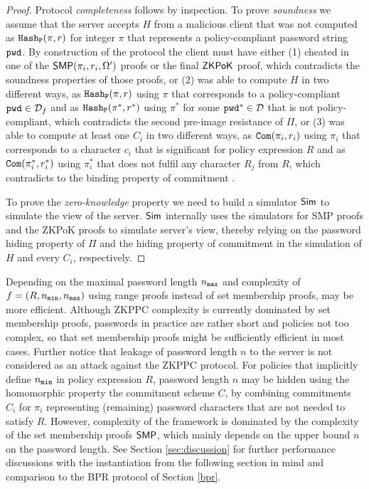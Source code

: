 \begin{proof}
Protocol \emph{completeness} follows by inspection.
To prove \emph{soundness} we assume that the server accepts $H$ from a malicious client that was not computed as $\mathtt{Hash_P}(\pi,r)$ for integer $\pi$ that represents a policy-compliant password string $\mathtt{pwd}$. 
By construction of the protocol the client must have either 
(1) cheated in one of the $\mathsf{SMP}(\pi_i,r_i,\Omega')$ proofs or the final $\mathsf{ZKPoK}$ proof, which contradicts the soundness properties of those proofs, or 
(2) was able to compute $H$ in two different ways, as $\mathtt{Hash_P}(\pi,r)$ using $\pi$ that corresponds to a policy-compliant $\mathtt{pwd}\in\mathcal{D}_f$ and as $\mathtt{Hash_P}(\pi^\ast,r^\ast)$ using $\pi^\ast$ for some $\mathtt{pwd}^\ast\in\mathcal{D}$ that is not policy-compliant, which contradicts the second pre-image resistance of $\Pi$, or 
(3) was able to compute at least one $C_i$ in two different ways, as $\mathtt{Com}(\pi_i, r_i)$ using $\pi_i$  that corresponds to a character $c_i$ that is significant for policy expression $R$ and as $\mathtt{Com}(\pi^\ast_i, r^\ast_i)$ using $\pi^\ast_i$ that does not fulfil any character $R_j$ from $R$, which contradicts to the binding property of commitment \Commitment.

To prove the \emph{zero-knowledge} property we need to build a simulator $\mathsf{Sim}$ to simulate the view of the server. 
$\mathsf{Sim}$ internally uses the simulators for \ac{SMP} proofs and the \ac{ZKPoK} proofs to simulate server's view, thereby relying on the password hiding property of $\Pi$ and the hiding property of commitment \Commitment in the simulation of $H$ and every $C_i$, respectively.
\end{proof}

\begin{remark}\label{rangeproofs}
Depending on the maximal password length ${n_\mathtt{max}}$ and complexity of $f=(R,{n_\mathtt{min}},{n_\mathtt{max}})$ using range proofs instead of set membership proofs, may be more efficient.
Although \ac{ZKPPC} complexity is currently dominated by set membership proofs, passwords in practice are rather short and policies not too complex, so that set membership proofs might be sufficiently efficient in most cases.
Further notice that leakage of password length $n$ to the server is not considered as an attack against the \ac{ZKPPC} protocol. 
For policies that implicitly define ${n_\mathtt{min}}$ in policy expression $R$, password length $n$ may be hidden using the homomorphic property the commitment scheme $C$, \ie by combining commitments $C_i$ for $\pi_i$ representing (remaining) password characters that are not needed to satisfy $R$.
However, complexity of the framework is dominated by the complexity of the set membership proofs $\mathsf{SMP}$, which mainly depends on the upper bound $n$ on the password length.
See Section \ref{sec:discussion} for further performance discussions with the instantiation from the following section in mind and comparison to the \ac{BPR} protocol of Section \ref{bpr}.
\end{remark}

